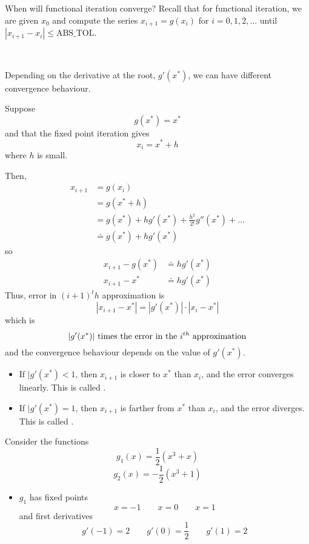 When will functional iteration converge? Recall that for functional iteration, we are given \( x_0 \) and compute the series \( x_{i+1} = g(x_i) \) for \( i = 0, 1, 2, \dots \) until \( | x_{i+1} - x_i | \leq \text{ABS\_TOL} \).

    {~~~}

Depending on the derivative at the root, \( g'(x^\ast) \), we can have different convergence behaviour.

Suppose \[
    g(x^\ast) = x^\ast
\] and that the fixed point iteration gives \[
    x_i = x^\ast + h
\] where \( h \) is small.

Then, \begin{align*}
    x_{i+1} & = g(x_i)                                                        \\
            & = g(x^\ast + h)                                                 \\
            & = g(x^\ast) + h g'(x^\ast) + \frac{h^2}{2!} g''(x^\ast) + \dots \\
            & \doteq g(x^\ast) + h g'(x^\ast)
\end{align*} so \begin{align*}
    x_{i+1} - g(x^\ast) & \doteq h g'(x^\ast) \\
    x_{i+1} - x^\ast    & \doteq h g'(x^\ast)
\end{align*}
Thus, error in \( (i+1)^th \) approximation is \[
    | x_{i+1} - x^\ast | = | g'(x^\ast) | \cdot | x_i - x^\ast |
\] which is \[
    | g'(x^\ast) | \text{ times the error in the \( i^{th} \) approximation}
\] and the convergence behaviour depends on the value of \( g'(x^\ast) \).

\begin{itemize}
    \item If \( |g'(x^\ast) < 1 \), then \( x_{i+1} \) is closer to \( x^\ast \) than \( x_i \), and the error converges linearly. This is called .
    \item If \( |g'(x^\ast) = 1 \), then \( x_{i+1} \) is farther from \( x^\ast \) than \( x_i \), and the error diverges. This is called .
\end{itemize}

\begin{example}
    Consider the functions
    \[
        g_1(x) = \frac{1}{2} \left( x^3 + x \right)
    \] \[
        g_2(x) = -\frac{1}{2} \left( x^3 + 1 \right)
    \]

    \begin{itemize}
        \item \( g_1 \) has fixed points \[
                  x = -1 \qquad x = 0 \qquad x = 1
              \] and first derivatives \[
                  g'(-1) = 2 \qquad g'(0) = \frac{1}{2} \qquad g'(1) = 2
              \]
    \end{itemize}
\end{example}